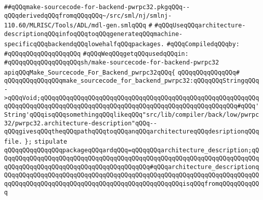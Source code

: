 \label{src/lib/compiler/back/low/tools/arch/make-sourcecode-for-backend-pwrpc32.pkg}
\verb|##qQQqmake-sourcecode-for-backend-pwrpc32.pkgqQQq--qQQqderivedqQQqfromqQQqqQQq~/src/sml/nj/smlnj-110.60/MLRISC/Tools/ADL/mdl-gen.smlqQQq|\newline
\verb|#|\newline
\verb|#qQQqUseqQQqarchitecture-descriptionqQQqinfoqQQqtoqQQqgenerateqQQqmachine-specificqQQqbackendqQQqlowehalfqQQqpackages.|\newline
\newline
\verb|#qQQqCompiledqQQqby:|\newline
\verb|#qQQqqQQqqQQqqQQqqQQq|\newline
\newline
\verb|#qQQqWeqQQqgetqQQqusedqQQqin:|\newline
\verb|#qQQqqQQqqQQqqQQqqQQqsh/make-sourcecode-for-backend-pwrpc32|\newline
\newline
\newline
\newline
\newline
\newline
\newline
\newline
\verb|apiqQQqMake_Sourcecode_For_Backend_pwrpc32qQQq{|\newline
\verb|qQQqqQQqqQQqqQQq#|\newline
\verb|qQQqqQQqqQQqqQQqmake_sourcecode_for_backend_pwrpc32:qQQqqQQqStringqQQq->qQQqVoid;qQQqqQQqqQQqqQQqqQQqqQQqqQQqqQQqqQQqqQQqqQQqqQQqqQQqqQQqqQQqqQQqqQQqqQQqqQQqqQQqqQQqqQQqqQQqqQQqqQQqqQQqqQQqqQQqqQQqqQQqqQQq#qQQq'String'qQQqisqQQqsomethingqQQqlikeqQQq"src/lib/compiler/back/low/pwrpc32/pwrpc32.architecture-description"qQQq--qQQqgivesqQQqtheqQQqpathqQQqtoqQQqanqQQqarchitectureqQQqdesriptionqQQqfile.|\newline
\verb|};|\newline
\newline
\verb|stipulate|\newline
\verb|qQQqqQQqqQQqqQQqpackageqQQqardqQQq=qQQqqQQqarchitecture_description;qQQqqQQqqQQqqQQqqQQqqQQqqQQqqQQqqQQqqQQqqQQqqQQqqQQqqQQqqQQqqQQqqQQqqQQqqQQqqQQqqQQqqQQqqQQqqQQqqQQqqQQqqQQqqQQq#qQQqarchitecture_descriptionqQQqqQQqqQQqqQQqqQQqqQQqqQQqqQQqqQQqqQQqqQQqqQQqqQQqqQQqqQQqqQQqqQQqqQQqqQQqqQQqqQQqqQQqqQQqqQQqqQQqqQQqqQQqqQQqqQQqqQQqisqQQqfromqQQqqQQqqQQq|\newline
